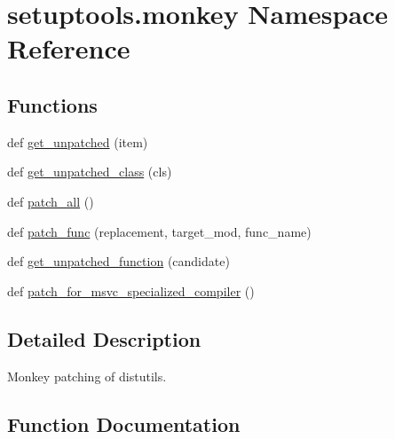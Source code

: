 \hypertarget{namespacesetuptools_1_1monkey}{}\section{setuptools.\+monkey Namespace Reference}
\label{namespacesetuptools_1_1monkey}
\subsection*{Functions}
\begin{DoxyCompactItemize}
\item 
def \hyperlink{namespacesetuptools_1_1monkey_aca0a412fd577e44c2a0d0847019103db}{get\+\_\+unpatched} (item)
\item 
def \hyperlink{namespacesetuptools_1_1monkey_ad46b685f3cc7245cde194b4b7831b38a}{get\+\_\+unpatched\+\_\+class} (cls)
\item 
def \hyperlink{namespacesetuptools_1_1monkey_a593eccd6bead483dc9479ed13d1c4f16}{patch\+\_\+all} ()
\item 
def \hyperlink{namespacesetuptools_1_1monkey_ac6c1bb45a1d90ebcaf099ada0682616b}{patch\+\_\+func} (replacement, target\+\_\+mod, func\+\_\+name)
\item 
def \hyperlink{namespacesetuptools_1_1monkey_a394451d3a77b5f2ff32bc108d7b677d4}{get\+\_\+unpatched\+\_\+function} (candidate)
\item 
def \hyperlink{namespacesetuptools_1_1monkey_a496bc1769e481213444b1d53185b1b89}{patch\+\_\+for\+\_\+msvc\+\_\+specialized\+\_\+compiler} ()
\end{DoxyCompactItemize}


\subsection{Detailed Description}
\begin{DoxyVerb}Monkey patching of distutils.
\end{DoxyVerb}
 

\subsection{Function Documentation}
\mbox{\label{namespacesetuptools_1_1monkey_aca0a412fd577e44c2a0d0847019103db}} 
